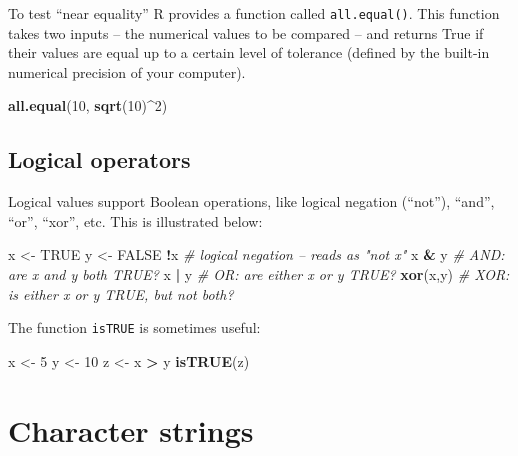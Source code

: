 \documentclass[]{book}
\newenvironment{Shaded}{\begin{snugshade}}{\end{snugshade}}
\newcommand{\CommentTok}[1]{\textcolor[rgb]{0.56,0.35,0.01}{\textit{#1}}}
\newcommand{\DecValTok}[1]{\textcolor[rgb]{0.00,0.00,0.81}{#1}}
\newcommand{\KeywordTok}[1]{\textcolor[rgb]{0.13,0.29,0.53}{\textbf{#1}}}
\newcommand{\NormalTok}[1]{#1}
\newcommand{\OperatorTok}[1]{\textcolor[rgb]{0.81,0.36,0.00}{\textbf{#1}}}
\newcommand{\OtherTok}[1]{\textcolor[rgb]{0.56,0.35,0.01}{#1}}
\newcommand{\StringTok}[1]{\textcolor[rgb]{0.31,0.60,0.02}{#1}}
\theoremstyle{definition}
\theoremstyle{definition}
\theoremstyle{definition}
\theoremstyle{remark}
\begin{document}
To test ``near equality'' R provides a function called
\texttt{all.equal()}. This function takes two inputs -- the numerical
values to be compared -- and returns True if their values are equal up
to a certain level of tolerance (defined by the built-in numerical
precision of your computer).

\begin{Shaded}
\begin{Highlighting}[]
\KeywordTok{all.equal}\NormalTok{(}\DecValTok{10}\NormalTok{, }\KeywordTok{sqrt}\NormalTok{(}\DecValTok{10}\NormalTok{)}\OperatorTok{^}\DecValTok{2}\NormalTok{)}
\end{Highlighting}
\end{Shaded}

\hypertarget{logical-operators}{%
\subsection{Logical operators}\label{logical-operators}}

Logical values support Boolean operations, like logical negation
(``not''), ``and'', ``or'', ``xor'', etc. This is illustrated below:

\begin{Shaded}
\begin{Highlighting}[]
\NormalTok{x <-}\StringTok{ }\OtherTok{TRUE}
\NormalTok{y <-}\StringTok{ }\OtherTok{FALSE}
\OperatorTok{!}\NormalTok{x  }\CommentTok{# logical negation -- reads as "not x"}
\NormalTok{x }\OperatorTok{&}\StringTok{ }\NormalTok{y }\CommentTok{# AND: are x and y both TRUE?}
\NormalTok{x }\OperatorTok{|}\StringTok{ }\NormalTok{y }\CommentTok{# OR: are either x or y TRUE?}
\KeywordTok{xor}\NormalTok{(x,y)  }\CommentTok{# XOR: is either x or y TRUE, but not both?}
\end{Highlighting}
\end{Shaded}

The function \texttt{isTRUE} is sometimes useful:

\begin{Shaded}
\begin{Highlighting}[]
\NormalTok{x <-}\StringTok{ }\DecValTok{5}
\NormalTok{y <-}\StringTok{ }\DecValTok{10}
\NormalTok{z <-}\StringTok{ }\NormalTok{x }\OperatorTok{>}\StringTok{ }\NormalTok{y}
\KeywordTok{isTRUE}\NormalTok{(z)}
\end{Highlighting}
\end{Shaded}

\hypertarget{character-strings}{%
\section{Character strings}\label{character-strings}}
\end{document}
